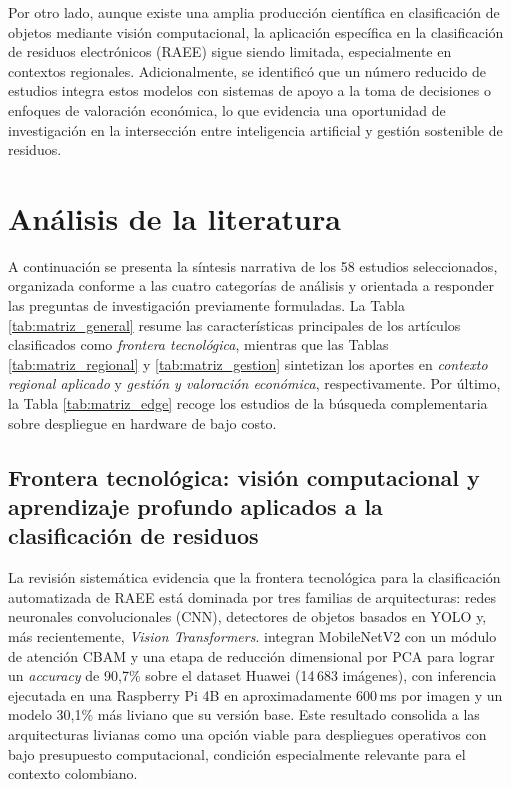 Por otro lado, aunque existe una amplia producción científica en clasificación de objetos mediante visión computacional, la aplicación específica en la clasificación de residuos electrónicos (RAEE) sigue siendo limitada, especialmente en contextos regionales. Adicionalmente, se identificó que un número reducido de estudios integra estos modelos con sistemas de apoyo a la toma de decisiones o enfoques de valoración económica, lo que evidencia una oportunidad de investigación en la intersección entre inteligencia artificial y gestión sostenible de residuos.

\section{Análisis de la literatura}

A continuación se presenta la síntesis narrativa de los 58 estudios seleccionados, organizada conforme a las cuatro categorías de análisis y orientada a responder las preguntas de investigación previamente formuladas. La Tabla \ref{tab:matriz_general} resume las características principales de los artículos clasificados como \textit{frontera tecnológica}, mientras que las Tablas \ref{tab:matriz_regional} y \ref{tab:matriz_gestion} sintetizan los aportes en \textit{contexto regional aplicado} y \textit{gestión y valoración económica}, respectivamente. Por último, la Tabla \ref{tab:matriz_edge} recoge los estudios de la búsqueda complementaria sobre despliegue en hardware de bajo costo.

\subsection{Frontera tecnológica: visión computacional y aprendizaje profundo aplicados a la clasificación de residuos}

La revisión sistemática evidencia que la frontera tecnológica para la clasificación automatizada de RAEE está dominada por tres familias de arquitecturas: redes neuronales convolucionales (CNN), detectores de objetos basados en YOLO y, más recientemente, \textit{Vision Transformers}. \cite{jinGarbageDetectionClassification2023} integran MobileNetV2 con un módulo de atención CBAM y una etapa de reducción dimensional por PCA para lograr un \textit{accuracy} de 90{,}7\% sobre el dataset Huawei (14\,683 imágenes), con inferencia ejecutada en una Raspberry Pi 4B en aproximadamente 600\,ms por imagen y un modelo 30{,}1\% más liviano que su versión base. Este resultado consolida a las arquitecturas livianas como una opción viable para despliegues operativos con bajo presupuesto computacional, condición especialmente relevante para el contexto colombiano.\\


